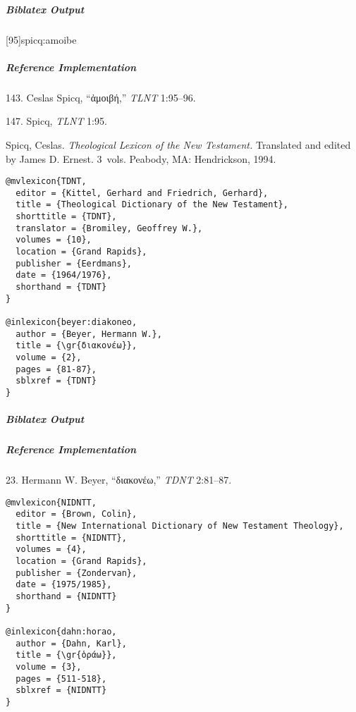 \documentclass[a4paper]{article}
\newcommand{\gr}[1]{{\greekfont #1}}
\newenvironment{biboutput}{%
  \subparagraph{Biblatex Output}
}{\color{black}}
\newenvironment{refimp}{%
  \subparagraph{Reference Implementation}
  \color{reference-colour}
  \rm
}{\par\color{black}}
\begin{document}
\begin{biboutput}
  [95]{spicq:amoibe}
\end{biboutput}

\begin{refimp}
  143. Ceslas Spicq, “\gr{ἀμοιβή},” \emph{TLNT} 1:95–96.

  147. Spicq, \emph{TLNT} 1:95.

  \hangindent\bibindent Spicq, Ceslas. \emph{Theological Lexicon of the New
  Testament.} Translated and edited by James D. Ernest. 3~vols. Peabody, MA:
  Hendrickson, 1994.

\end{refimp}

\medskip

\begin{lstlisting}
@mvlexicon{TDNT,
  editor = {Kittel, Gerhard and Friedrich, Gerhard},
  title = {Theological Dictionary of the New Testament},
  shorttitle = {TDNT},
  translator = {Bromiley, Geoffrey W.},
  volumes = {10},
  location = {Grand Rapids},
  publisher = {Eerdmans},
  date = {1964/1976},
  shorthand = {TDNT}
}

@inlexicon{beyer:diakoneo,
  author = {Beyer, Hermann W.},
  title = {\gr{διακονέω}},
  volume = {2},
  pages = {81-87},
  sblxref = {TDNT}
}
\end{lstlisting}

\begin{biboutput}
\end{biboutput}

\begin{refimp}
  23. Hermann W. Beyer, “\gr{διακονέω},” \emph{TDNT} 2:81–87.

\end{refimp}

\medskip

\begin{lstlisting}
@mvlexicon{NIDNTT,
  editor = {Brown, Colin},
  title = {New International Dictionary of New Testament Theology},
  shorttitle = {NIDNTT},
  volumes = {4},
  location = {Grand Rapids},
  publisher = {Zondervan},
  date = {1975/1985},
  shorthand = {NIDNTT}
}

@inlexicon{dahn:horao,
  author = {Dahn, Karl},
  title = {\gr{ὁράω}},
  volume = {3},
  pages = {511-518},
  sblxref = {NIDNTT}
}
\end{lstlisting}
\end{document}
